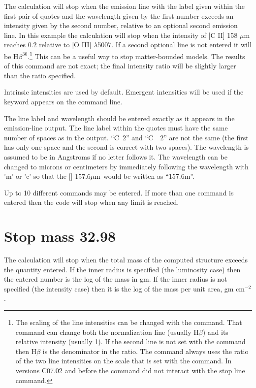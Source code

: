 The calculation will stop when the emission line with the label given
within the first pair of quotes and the wavelength given by
the first number
exceeds an intensity given by the second number, relative to an optional
second emission line.
In this example the calculation will stop when the
intensity of [C II] 158 $\mu $m reaches 0.2 relative to [O III] $\lambda$5007.
If a second
optional line is not entered it will be H$\beta^{30}$.\footnote{The scaling of the line intensities can be changed with the
command.
That command can change both the
normalization line (usually H$\beta$) and its relative intensity
(usually 1).
If the second line is not set with the  command
then
H$\beta$ is the
denominator in the ratio.
The  command always uses the ratio of
the two line intensities on the scale that is set with the
 command.
In versions C07.02 and before the  command
did not interact with
the stop line command.}
This can be a useful way
to stop matter-bounded models.
The results of this command are not exact;
the final intensity ratio will be slightly larger than the ratio specified.

Intrinsic intensities are used by default.
Emergent intensities will be used if the keyword
 appears on the command line.

The line label and wavelength should be entered exactly as it appears
in the emission-line output.
The line label within the quotes must have
the same number of spaces as in the output.
``C~2'' and ``C~~2'' are not the same (the first has only one space
and the second is correct with two spaces).
The wavelength is assumed to be in Angstroms if no letter
follows it.
The wavelength can be changed to microns or centimeters by immediately
following the wavelength with 'm' or 'c' so that
the [\cii ] $157.6\hbox{$\mu$m}$ would be written as ``157.6m''.

Up to 10 different  commands may be entered.
If more than one
 command is entered then the code
will stop when any limit is reached.

\section{Stop mass 32.98}

The calculation will stop when the total mass of the computed structure
exceeds the quantity entered.  If the inner radius is specified (the
luminosity case) then the entered number is the log of the mass in gm.
If the inner radius is not specified (the intensity case) then it is the
log of the mass per unit area, gm cm$^{-2}$.

